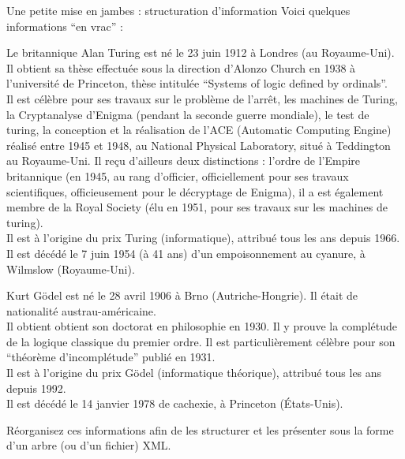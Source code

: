 \begin{frame}[allowframebreaks]{Une petite mise en jambes : structuration d'information}
Voici quelques informations ``en vrac'' :

\smallskip


\begin{footnotesize}
Le britannique Alan Turing est n\'e le  23 juin 1912 \`a Londres (au Royaume-Uni). 
 Il obtient sa th\`ese effectu\'ee sous la direction d'Alonzo Church en 1938 \`a l'universit\'e de Princeton, th\`ese intitul\'ee ``Systems of logic defined by ordinals''. \\
 Il est c\'el\`ebre pour ses travaux sur le probl\`eme de l'arr\^et, les machines de Turing, la Cryptanalyse d'Enigma (pendant la seconde guerre mondiale), le test de turing, la conception et la r\'ealisation de l'ACE (Automatic Computing Engine) r\'ealis\'e entre 1945 et 1948, au National Physical Laboratory, situ\'e \`a Teddington au Royaume-Uni. Il re\c{c}u d'ailleurs deux distinctions : l'ordre de l'Empire britannique (en 1945, au rang d'officier, officiellement pour ses travaux scientifiques, officieusement pour le d\'ecryptage de Enigma), il a est \'egalement membre de la Royal Society (\'elu en 1951, pour ses travaux sur les machines de turing).\\
 Il est \`a l'origine du prix Turing (informatique), attribu\'e tous les ans depuis 1966.\\
 Il est d\'ec\'ed\'e le 7 juin 1954 (\`a 41 ans) d'un empoisonnement au cyanure, \`a Wilmslow (Royaume-Uni).

\smallskip

 Kurt G\"odel est n\'e le 28 avril 1906 \`a Brno (Autriche-Hongrie). Il \'etait de nationalit\'e austrau-am\'ericaine.\\
 Il obtient obtient son doctorat en philosophie en 1930. Il y prouve la compl\'etude de la logique classique du premier ordre. Il est particuli\`erement c\'el\`ebre pour son ``th\'eor\`eme d'incompl\'etude'' publi\'e en 1931.\\
 Il est \`a l'origine du prix G\"odel (informatique th\'eorique), attribu\'e tous les ans depuis 1992.\\
 Il est d\'ec\'ed\'e le 14 janvier 1978 de cachexie, \`a Princeton (\'Etats-Unis).\\
\end{footnotesize}

\begin{exoblock}
R\'eorganisez ces informations afin de les structurer et les pr\'esenter sous la forme d'un arbre (ou d'un fichier) XML.
\end{exoblock}




\end{frame}
